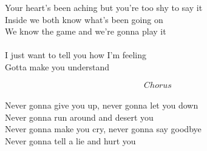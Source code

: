 Your heart's been aching but you're too shy to say it\\
Inside we both know what's been going on\\
We know the game and we're gonna play it\\
\\
I just want to tell you how I'm feeling\\
Gotta make you understand\par
\vspace{10pt}
\[Chorus\]\\
Never gonna give you up, never gonna let you down\\
Never gonna run around and desert you\\
Never gonna make you cry, never gonna say goodbye\\
Never gonna tell a lie and hurt you
